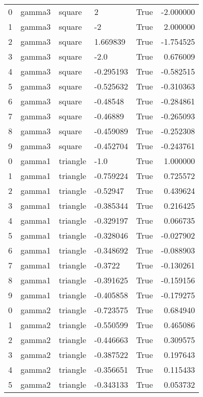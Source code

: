\begin{tabular}{lllllr}
   0 & gamma3 &     square &         2 &  True & -2.000000 \\
   1 & gamma3 &     square &        -2 &  True &  2.000000 \\
   2 & gamma3 &     square &  1.669839 &  True & -1.754525 \\
   3 & gamma3 &     square &      -2.0 &  True &  0.676009 \\
   4 & gamma3 &     square & -0.295193 &  True & -0.582515 \\
   5 & gamma3 &     square & -0.525632 &  True & -0.310363 \\
   6 & gamma3 &     square &  -0.48548 &  True & -0.284861 \\
   7 & gamma3 &     square &  -0.46889 &  True & -0.265093 \\
   8 & gamma3 &     square & -0.459089 &  True & -0.252308 \\
   9 & gamma3 &     square & -0.452704 &  True & -0.243761 \\
   0 & gamma1 &   triangle &      -1.0 &  True &  1.000000 \\
   1 & gamma1 &   triangle & -0.759224 &  True &  0.725572 \\
   2 & gamma1 &   triangle &  -0.52947 &  True &  0.439624 \\
   3 & gamma1 &   triangle & -0.385344 &  True &  0.216425 \\
   4 & gamma1 &   triangle & -0.329197 &  True &  0.066735 \\
   5 & gamma1 &   triangle & -0.328046 &  True & -0.027902 \\
   6 & gamma1 &   triangle & -0.348692 &  True & -0.088903 \\
   7 & gamma1 &   triangle &   -0.3722 &  True & -0.130261 \\
   8 & gamma1 &   triangle & -0.391625 &  True & -0.159156 \\
   9 & gamma1 &   triangle & -0.405858 &  True & -0.179275 \\
   0 & gamma2 &   triangle & -0.723575 &  True &  0.684940 \\
   1 & gamma2 &   triangle & -0.550599 &  True &  0.465086 \\
   2 & gamma2 &   triangle & -0.446663 &  True &  0.309575 \\
   3 & gamma2 &   triangle & -0.387522 &  True &  0.197643 \\
   4 & gamma2 &   triangle & -0.356651 &  True &  0.115433 \\
   5 & gamma2 &   triangle & -0.343133 &  True &  0.053732 \\

\end{tabular}
